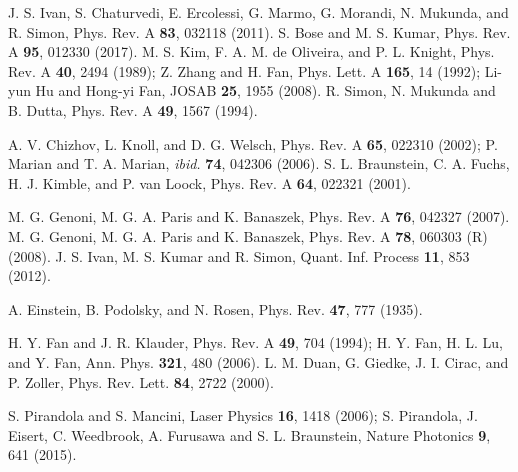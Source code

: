 \documentclass[letter,scriptaddress,twocolumn, prl,showkeys]{revtex4}
\begin{document}
\begin{thebibliography}{}
 J. S. Ivan, S. Chaturvedi, E. Ercolessi, G. Marmo, G. Morandi, N. Mukunda, and R. Simon, Phys. Rev. A {\bf 83}, 032118 (2011).
 S. Bose and M. S. Kumar, Phys. Rev. A \textbf{95}, 012330 (2017).
 M. S. Kim, F. A. M. de Oliveira, and P. L. Knight, Phys. Rev. A {\bf 40}, 2494 (1989); Z. Zhang and H. Fan, Phys. Lett. A {\bf 165}, 14 (1992); Li-yun Hu and Hong-yi Fan, JOSAB {\bf 25}, 1955 (2008).
 R. Simon, N. Mukunda and B. Dutta, Phys. Rev. A {\bf 49}, 1567 (1994).

 A. V. Chizhov, L. Knoll, and D. G. Welsch, Phys. Rev. A \textbf{65}, 022310 (2002); P. Marian and T. A. Marian, \emph{ibid.} \textbf{74}, 042306 (2006).
 S. L. Braunstein, C. A. Fuchs, H. J. Kimble, and P. van Loock, Phys. Rev. A \textbf{64}, 022321 (2001).

 M. G. Genoni, M. G. A. Paris and K. Banaszek, Phys. Rev. A \textbf{76}, 042327 (2007).
 M. G. Genoni, M. G. A. Paris and K. Banaszek, Phys. Rev. A \textbf{78}, 060303 (R) (2008).
 J. S. Ivan, M. S. Kumar and R. Simon, Quant. Inf. Process \textbf{11}, 853 (2012).

 A. Einstein, B. Podolsky, and N. Rosen, Phys. Rev. \textbf{47}, 777 (1935).

 H. Y. Fan and J. R. Klauder, Phys. Rev. A \textbf{49}, 704 (1994); H. Y. Fan, H. L. Lu, and Y. Fan, Ann. Phys. \textbf{321}, 480 (2006).
 L. M. Duan, G. Giedke, J. I. Cirac, and P. Zoller, Phys. Rev. Lett. {\bf 84}, 2722 (2000).

 S. Pirandola and S. Mancini, Laser Physics {\bf 16}, 1418 (2006); S. Pirandola, J. Eisert, C. Weedbrook, A. Furusawa and S. L. Braunstein, Nature Photonics {\bf 9}, 641 (2015).

\end{thebibliography}
\end{document}
